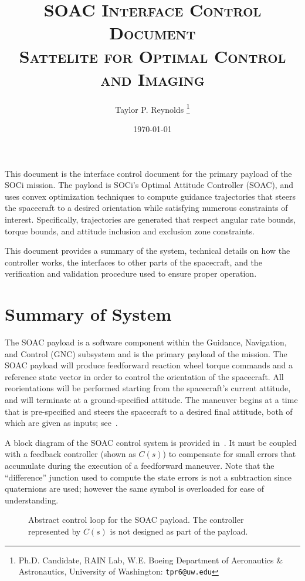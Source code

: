 \documentclass[10pt]{article}
\title{\textsc{SOAC Interface Control Document \\ {\small \textbf{S}attelite for \textbf{O}ptimal \textbf{C}ontrol and \textbf{I}maging}}}
\author{
  Taylor P. Reynolds%
  \thanks{Ph.D. Candidate, RAIN Lab, W.E. Boeing Department of Aeronautics \& Astronautics, University of Washington: \texttt{tpr6@uw.edu} } }
\date{\today}
\begin{document}
 
\maketitle

This document is the interface control document for the primary payload of the SOCi mission. The payload is SOCi's Optimal Attitude Controller (SOAC), and uses convex optimization techniques to compute guidance trajectories that steers the spacecraft to a desired orientation while satisfying numerous constraints of interest. Specifically, trajectories are generated that respect angular rate bounds, torque bounds, and attitude inclusion and exclusion zone constraints. 

This document provides a summary of the system, technical details on how the controller works, the interfaces to other parts of the spacecraft, and the verification and validation procedure used to ensure proper operation. 

\section{Summary of System}\label{sec:summary}

The SOAC payload is a software component within the Guidance, Navigation, and Control (GNC) subsystem and is the primary payload of the mission. The SOAC payload will produce feedforward reaction wheel torque commands and a reference state vector in order to control the orientation of the spacecraft. All reorientations will be performed starting from the spacecraft’s current attitude, and will terminate at a ground-specified attitude. The maneuver begins at a time that is pre-specified and steers the spacecraft to a desired final attitude, both of which are given as inputs; see~.

A block diagram of the SOAC control system is provided in~. It must be coupled with a feedback controller (shown as $C(s)$) to compensate for small errors that accumulate during the execution of a feedforward maneuver. Note that the ``difference'' junction used to compute the state errors is not a subtraction since quaternions are used; however the same symbol is overloaded for ease of understanding.

\begin{figure}[bth]
\centering

\caption{Abstract control loop for the SOAC payload. The controller represented by $C(s)$ is not designed as part of the payload.}
\label{fig:soac_loop}
\end{figure}
\end{document}
